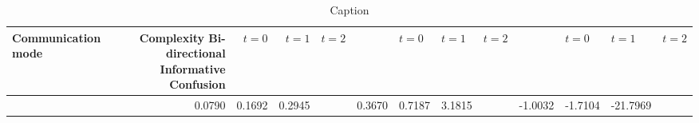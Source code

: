 \begin{table*}\centering
{}
\begin{tabular}{@{}lrrrr@{}}\toprule
Communication mode &Complexity
Bi-directional
Informative
Confusion
\midrule
& $t=0$ & $t=1$ & $t=2$ && $t=0$ & $t=1$ & $t=2$ && $t=0$ & $t=1$ & $t=2$\\ \midrule
& 0.0790 & 0.1692 & 0.2945 && 0.3670 & 0.7187 & 3.1815 && -1.0032 & -1.7104 & -21.7969\\

\bottomrule
\end{tabular}
\caption{Caption}
\end{table*}